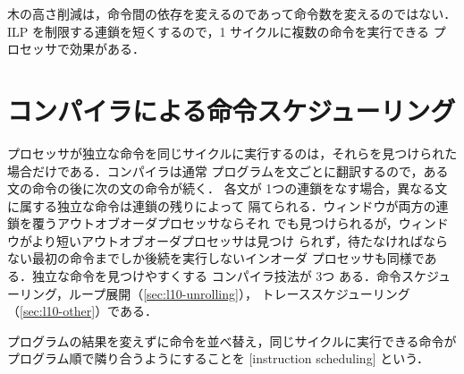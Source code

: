 \documentclass[../main.tex]{subfiles}
\begin{document}
\begin{keypoint}
  木の高さ削減は，命令間の依存を変えるのであって命令数を変えるのではない．
  ILP を制限する連鎖を短くするので，1 サイクルに複数の命令を実行できる
  プロセッサで効果がある．
\end{keypoint}

\section{コンパイラによる命令スケジューリング}
\label{sec:l10-scheduling}

プロセッサが独立な命令を同じサイクルに実行するのは，それらを見つけられた
場合だけである．コンパイラは通常
プログラムを文ごとに翻訳するので，ある文の命令の後に次の文の命令が続く．
各文が 1つの連鎖をなす場合，異なる文に属する独立な命令は連鎖の残りによって
隔てられる．ウィンドウが両方の連鎖を覆うアウトオブオーダプロセッサならそれ
でも見つけられるが，ウィンドウがより短いアウトオブオーダプロセッサは見つけ
られず，待たなければならない最初の命令までしか後続を実行しないインオーダ
プロセッサも同様である．独立な命令を見つけやすくする
コンパイラ技法が 3つ
ある．命令スケジューリング，ループ展開（\cref{sec:l10-unrolling}），
トレーススケジューリング（\cref{sec:l10-other}）である．

\begin{definition}[命令スケジューリング]
  \label{def:l10-scheduling}
  プログラムの結果を変えずに命令を並べ替え，同じサイクルに実行できる命令が
  プログラム順で隣り合うようにすることを
  [instruction scheduling]%
  という．
\end{definition}
\end{document}
